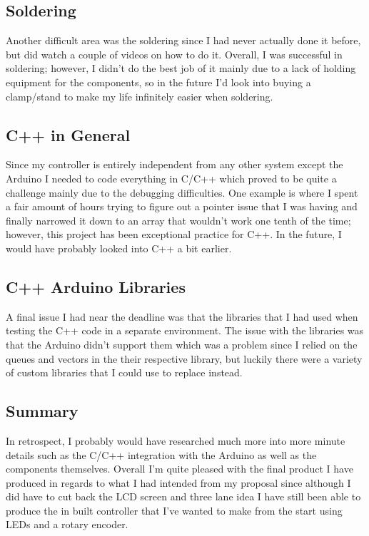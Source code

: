 \documentclass{article}
\begin{document}
\subsection{Soldering}
Another difficult area was the soldering since I had never actually done it before, but did watch a couple of videos on how to do it. Overall, I was successful in soldering; however, I didn't do the best job of it mainly due to a lack of holding equipment for the components, so in the future I'd look into buying a clamp/stand to make my life infinitely easier when soldering.
\\

\subsection{C++ in General}
Since my controller is entirely independent from any other system except the Arduino I needed to code everything in C/C++ which proved to be quite a challenge mainly due to the debugging difficulties. One example is where I spent a fair amount of hours trying to figure out a pointer issue that I was having and finally narrowed it down to an array that wouldn't work one tenth of the time; however, this project has been exceptional practice for C++. In the future, I would have probably looked into C++ a bit earlier.
\\

\subsection{C++ Arduino Libraries}
A final issue I had near the deadline was that the libraries that I had used when testing the C++ code in a separate environment. The issue with the libraries was that the Arduino didn't support them which was a problem since I relied on the queues and vectors in the their respective library, but luckily there were a variety of custom libraries that I could use to replace instead.
\\

\subsection{Summary}
In retrospect, I probably would have researched much more into more minute details such as the C/C++ integration with the Arduino as well as the components themselves. Overall I'm quite pleased with the final product I have produced in regards to what I had intended from my proposal since although I did have to cut back the LCD screen and three lane idea I have still been able to produce the in built controller that I've wanted to make from the start using LEDs and a rotary encoder.
\end{document}
